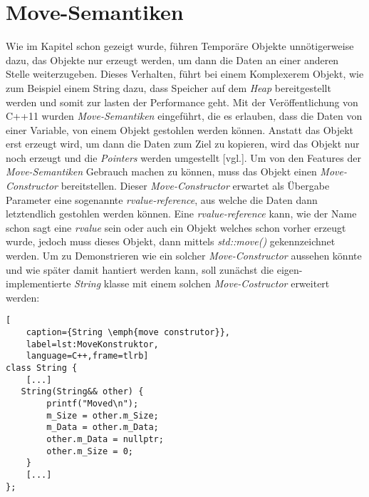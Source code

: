 \section{Move-Semantiken}\label{sec:move}
Wie im Kapitel \emph{} schon gezeigt wurde, führen Temporäre Objekte
unnötigerweise
dazu, das Objekte nur erzeugt werden, um dann die Daten an einer anderen Stelle weiterzugeben.
Dieses Verhalten, führt bei einem Komplexerem Objekt, wie zum Beispiel einem String dazu, dass
Speicher auf dem \emph{Heap} bereitgestellt werden und somit zur lasten der Performance geht.
\newline
\newline
Mit der Veröffentlichung von C++11 wurden \emph{Move-Semantiken} eingeführt, die es erlauben, dass
die Daten von einer Variable, von einem Objekt gestohlen werden können. Anstatt das Objekt
erst erzeugt wird, um dann die Daten zum Ziel zu kopieren, wird das Objekt nur noch erzeugt und
die \emph{Pointers} werden umgestellt \cite{VisualisingC++}[vgl.]. Um von den Features der
\emph{Move-Semantiken} Gebrauch machen zu können, muss das Objekt einen \emph{Move-Constructor}
bereitstellen. Dieser \emph{Move-Constructor} erwartet als Übergabe Parameter eine sogenannte
\emph{rvalue-reference}, aus welche die Daten dann letztendlich gestohlen werden können. Eine
\emph{rvalue-reference} kann, wie der Name schon sagt eine \emph{rvalue} sein oder auch ein Objekt
welches schon vorher erzeugt wurde, jedoch muss dieses Objekt, dann mittels \emph{std::move()}
gekennzeichnet werden.
\newline
\newline
Um zu Demonstrieren wie ein solcher \emph{Move-Constructor} aussehen könnte und wie später damit
hantiert werden kann, soll zunächst die eigen-implementierte \emph{String} klasse mit einem solchen
\emph{Move-Costructor} erweitert werden:

\begin{lstlisting}[
    caption={String \emph{move construtor}},
    label=lst:MoveKonstruktor,
    language=C++,frame=tlrb]
class String {
	[...]
   String(String&& other) {
        printf("Moved\n");
        m_Size = other.m_Size;
        m_Data = other.m_Data;
        other.m_Data = nullptr;
        other.m_Size = 0;
    }
	[...]
};
\end{lstlisting}

